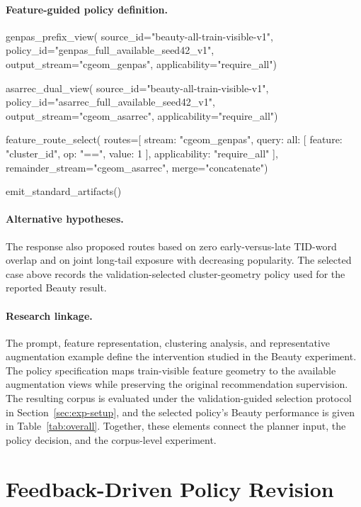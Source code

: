 \paragraph{Feature-guided policy definition.}
\begingroup\footnotesize
\begin{promptblock}
genpas_prefix_view(
  source_id="beauty-all-train-visible-v1",
  policy_id="genpas_full_available_seed42_v1",
  output_stream="cgeom_genpas",
  applicability="require_all")

asarrec_dual_view(
  source_id="beauty-all-train-visible-v1",
  policy_id="asarrec_full_available_seed42_v1",
  output_stream="cgeom_asarrec",
  applicability="require_all")

feature_route_select(
  routes=[{
    stream: "cgeom_genpas",
    query: {all: [{
      feature: "cluster_id", op: "==", value: 1
    }]},
    applicability: "require_all"
  }],
  remainder_stream="cgeom_asarrec",
  merge="concatenate")

emit_standard_artifacts()
\end{promptblock}
\endgroup

\paragraph{Alternative hypotheses.}
The response also proposed routes based on zero early-versus-late TID-word overlap and on joint long-tail exposure with decreasing popularity. The selected case above records the validation-selected cluster-geometry policy used for the reported Beauty result.

\paragraph{Research linkage.}
The prompt, feature representation, clustering analysis, and representative augmentation example define the intervention studied in the Beauty experiment. The policy specification maps train-visible feature geometry to the available augmentation views while preserving the original recommendation supervision. The resulting corpus is evaluated under the validation-guided selection protocol in Section~\ref{sec:exp-setup}, and the selected policy's Beauty performance is given in Table~\ref{tab:overall}. Together, these elements connect the planner input, the policy decision, and the corpus-level experiment.

\section{Feedback-Driven Policy Revision}
\label{app:policy-revision}

